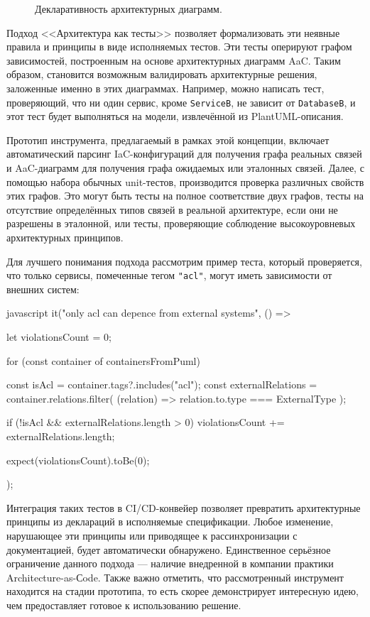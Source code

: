 \begin{figure}[ht]
   \centering
   
   \caption{\label{declarative-example} Декларативность архитектурных диаграмм.}
\end{figure}

Подход <<Архитектура как тесты>> позволяет формализовать эти неявные правила и принципы в виде исполняемых тестов. Эти тесты оперируют графом зависимостей, построенным на основе архитектурных диаграмм AaC. Таким образом, становится возможным валидировать архитектурные решения, заложенные именно в этих диаграммах. Например, можно написать тест, проверяющий, что ни один сервис, кроме \verb|ServiceB|, не зависит от \verb|DatabaseB|, и этот тест будет выполняться на модели, извлечённой из PlantUML-описания.

Прототип инструмента, предлагаемый в рамках этой концепции, включает автоматический парсинг IaC-конфигураций для получения графа реальных связей и AaC-диаграмм для получения графа ожидаемых или эталонных связей. Далее, с помощью набора обычных unit-тестов, производится проверка различных свойств этих графов. Это могут быть тесты на полное соответствие двух графов, тесты на отсутствие определённых типов связей в реальной архитектуре, если они не разрешены в эталонной, или тесты, проверяющие соблюдение высокоуровневых архитектурных принципов.

Для лучшего понимания подхода рассмотрим пример теста, который проверяется, что только сервисы, помеченные тегом \verb|"acl"|, могут иметь зависимости от внешних систем:

\begin{code}{javascript}
it("only acl can depence from external systems", () => {
  let violationsCount = 0;

  for (const container of containersFromPuml) { 
    const isAcl = container.tags?.includes("acl");
    const externalRelations = container.relations.filter(
      (relation) => relation.to.type === ExternalType
    );
    
    if (!isAcl && externalRelations.length > 0) {
      violationsCount += externalRelations.length;
    }
  }

  expect(violationsCount).toBe(0); 
});
\end{code}

Интеграция таких тестов в CI/CD-конвейер позволяет превратить архитектурные принципы из деклараций в исполняемые спецификации. Любое изменение, нарушающее эти принципы или приводящее к рассинхронизации с документацией, будет автоматически обнаружено. Единственное серьёзное ограничение данного подхода — наличие внедренной в компании практики Architecture-as-Сode. Также важно отметить, что рассмотренный инструмент находится на стадии прототипа, то есть скорее демонстрирует интересную идею, чем предоставляет готовое к использованию решение.


